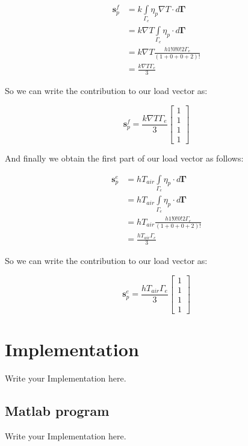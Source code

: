 \documentclass[12pt]{article}
\begin{document}
\begin{align*}
 \mathbf{s}_p^f &= k \int\limits_{\Gamma_{e}}{\eta_p\nabla T} \cdot d \mathbf{\Gamma} \\
 &= k \nabla T \int\limits_{\Gamma_{e}}{\eta_p} \cdot d \mathbf{\Gamma} \\
 &= k \nabla T \frac{h 1!0!0!2\Gamma_e}{(1+0+0+2)!} \\
 &= \frac{k\nabla T\Gamma_e}{3}
\end{align*}

So we can write the contribution to our load vector as:

\begin{equation}
\mathbf{s}_p^f = \frac{k\nabla T\Gamma_e}{3}
\begin{bmatrix} 1 \\ 1 \\ 1 \\ 1 
\end{bmatrix}
\end{equation}

And finally we obtain the first part of our load vector as follows:

\begin{align*}
 \mathbf{s}_p^e &= hT_{air} \int\limits_{\Gamma_{e}}{\eta_p} \cdot d \mathbf{\Gamma} \\
 &= hT_{air} \int\limits_{\Gamma_{e}}{\eta_p} \cdot d \mathbf{\Gamma} \\
 &= hT_{air} \frac{h 1!0!0!2\Gamma_e}{(1+0+0+2)!} \\
 &= \frac{hT_{air}\Gamma_e}{3}
\end{align*}

So we can write the contribution to our load vector as:

\begin{equation}
\mathbf{s}_p^e = \frac{hT_{air}\Gamma_e}{3}
\begin{bmatrix} 1 \\ 1 \\ 1 \\ 1 
\end{bmatrix}
\end{equation}

	\section{Implementation}
	Write your Implementation here.

	\subsection{Matlab program}
	Write your Implementation here.
	
\end{document}
